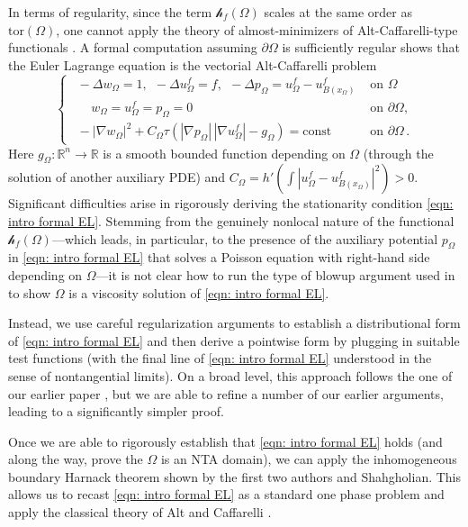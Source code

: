\documentclass[10pt, reqno]{amsart}
\numberwithin{equation}{section}
\def\R{{\mathbb R}}
\def\W{\Omega}
\def\tor{\mathrm{tor}}
\def\nl{\mathscr{h}_f}
\def\na{\nabla}
\begin{document}
In terms of regularity, since the term $\nl(\W)$ scales at the same order as $\tor(\W)$, one cannot apply the theory of almost-minimizers  of Alt-Caffarelli-type functionals \cite{DET}. A formal  computation  assuming $\partial \W$ is sufficiently regular shows that the Euler Lagrange equation is the vectorial Alt-Caffarelli problem
\begin{equation}
    \label{eqn: intro formal EL}
    \begin{cases}
\ \        -\Delta w_\W = 1, \ \  -\Delta u_\W^f = f, \ \ -\Delta p_\W = u_\W^f -u_{B(x_\W)}^f & \text{ on } \Omega\\
    \ \  \ \ \ \  \  w_\W = u_\W^f = p_\W = 0 & \text{ on } \partial \W,\\
       \ \  -|\na w_\W|^2 + C_\W \tau ( |\nabla p_\W| \, |\nabla u_\W^f| - g_\W)  = \text{const} & \text{ on }\partial \W\,.
    \end{cases}
\end{equation}
Here $g_\W:\R^n \to \R$ is a smooth bounded function depending on $\W$ (through the solution of another auxiliary PDE) and  $C_\W = h'(\int |u_\W^f - u_{B(x_\W)}^f|^2)>0$.
Significant difficulties arise in rigorously deriving the stationarity condition \eqref{eqn: intro formal EL}. Stemming from the genuinely nonlocal nature of the functional $\nl(\W)$---which leads, in particular, to the presence of the auxiliary potential $p_\W$ in \eqref{eqn: intro formal EL} that solves a Poisson equation with right-hand side depending on $\W$---it is not clear how to run the type of blowup argument used in \cite{blnp23} to show $\W$ is a viscosity solution of \eqref{eqn: intro formal EL}. 

Instead, we use careful regularization arguments to establish a distributional form of \eqref{eqn: intro formal EL} and then derive a pointwise form by plugging in suitable test functions (with the final line of \eqref{eqn: intro formal EL} understood in the sense of nontangential limits). On a broad level, this approach follows the one of our earlier paper \cite{AKN2}, but we are able to refine a number of our earlier arguments, leading to a significantly simpler proof.


Once we are able to rigorously establish that \eqref{eqn: intro formal EL} holds (and along the way, prove the $\W$ is an NTA domain), we can apply the inhomogeneous boundary Harnack theorem \cite{aks23} shown by the first two authors and Shahgholian. This allows us to recast \eqref{eqn: intro formal EL} as a standard one phase problem and apply the classical theory of Alt and Caffarelli \cite{AC81}.
\end{document}
